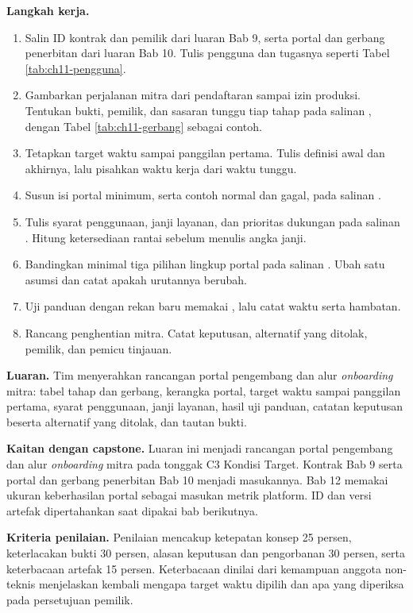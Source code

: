 \textbf{Langkah kerja.}
\begin{enumerate}
  \item Salin ID kontrak dan pemilik dari luaran Bab 9, serta portal dan gerbang penerbitan dari luaran Bab 10. Tulis pengguna dan tugasnya seperti Tabel
        \ref{tab:ch11-pengguna}.
  \item Gambarkan perjalanan mitra dari pendaftaran sampai izin produksi. Tentukan bukti, pemilik, dan sasaran tunggu tiap tahap pada salinan
        , dengan Tabel \ref{tab:ch11-gerbang} sebagai contoh.
  \item Tetapkan target waktu sampai panggilan pertama. Tulis definisi awal dan akhirnya, lalu pisahkan waktu kerja dari waktu tunggu.
  \item Susun isi portal minimum, serta contoh normal dan gagal, pada salinan .
  \item Tulis syarat penggunaan, janji layanan, dan prioritas dukungan pada salinan . Hitung ketersediaan
        rantai sebelum menulis angka janji.
  \item Bandingkan minimal tiga pilihan lingkup portal pada salinan . Ubah satu asumsi dan catat apakah urutannya
        berubah.
  \item Uji panduan dengan rekan baru memakai , lalu catat waktu serta hambatan.
  \item Rancang penghentian mitra. Catat keputusan, alternatif yang ditolak, pemilik, dan pemicu tinjauan.
\end{enumerate}

\textbf{Luaran.} Tim menyerahkan rancangan portal pengembang dan alur \textit{onboarding} mitra: tabel tahap dan gerbang, kerangka portal, target waktu sampai
panggilan pertama, syarat penggunaan, janji layanan, hasil uji panduan, catatan keputusan beserta alternatif yang ditolak, dan tautan bukti.

\textbf{Kaitan dengan capstone.} Luaran ini menjadi rancangan portal pengembang dan alur \textit{onboarding} mitra pada tonggak C3 Kondisi Target. Kontrak Bab 9
serta portal dan gerbang penerbitan Bab 10 menjadi masukannya. Bab 12 memakai ukuran keberhasilan portal sebagai masukan metrik platform. ID dan versi artefak
dipertahankan saat dipakai bab berikutnya.

\textbf{Kriteria penilaian.} Penilaian mencakup ketepatan konsep 25 persen, keterlacakan bukti 30 persen, alasan keputusan dan pengorbanan 30 persen, serta
keterbacaan artefak 15 persen. Keterbacaan dinilai dari kemampuan anggota non-teknis menjelaskan kembali mengapa target waktu dipilih dan apa yang diperiksa
pada persetujuan pemilik.

